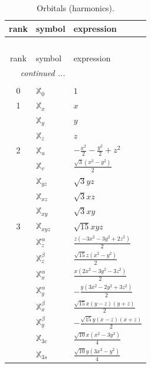 \documentclass[fleqn,9pt,landscape]{jsarticle}
\begin{document}
\begin{longtable}{cll}
\caption{Orbitals (harmonics).}
 \\
 \hline \hline
rank & symbol & expression \\ \hline \endfirsthead

\multicolumn{2}{l}{\tablename\ \thetable{}} \\
 \hline \hline
rank & symbol & expression \\ \hline \endhead

 \hline \hline
\multicolumn{2}{r}{\footnotesize\it continued ...} \\ \endfoot

 \hline \hline
\multicolumn{2}{r}{} \\ \endlastfoot

0 & $\mathbb{X}_{0}$ & $1$ \\ \hline
1 & $\mathbb{X}_{x}$ & $x$ \\
 & $\mathbb{X}_{y}$ & $y$ \\
 & $\mathbb{X}_{z}$ & $z$ \\ \hline
2 & $\mathbb{X}_{u}$ & $- \frac{x^{2}}{2} - \frac{y^{2}}{2} + z^{2}$ \\
 & $\mathbb{X}_{v}$ & $\frac{\sqrt{3} \left(x^{2} - y^{2}\right)}{2}$ \\
 & $\mathbb{X}_{yz}$ & $\sqrt{3} y z$ \\
 & $\mathbb{X}_{xz}$ & $\sqrt{3} x z$ \\
 & $\mathbb{X}_{xy}$ & $\sqrt{3} x y$ \\ \hline
3 & $\mathbb{X}_{xyz}$ & $\sqrt{15} x y z$ \\
 & $\mathbb{X}_{z}^{\alpha}$ & $\frac{z \left(- 3 x^{2} - 3 y^{2} + 2 z^{2}\right)}{2}$ \\
 & $\mathbb{X}_{z}^{\beta}$ & $\frac{\sqrt{15} z \left(x^{2} - y^{2}\right)}{2}$ \\
 & $\mathbb{X}_{x}^{\alpha}$ & $\frac{x \left(2 x^{2} - 3 y^{2} - 3 z^{2}\right)}{2}$ \\
 & $\mathbb{X}_{y}^{\alpha}$ & $- \frac{y \left(3 x^{2} - 2 y^{2} + 3 z^{2}\right)}{2}$ \\
 & $\mathbb{X}_{x}^{\beta}$ & $\frac{\sqrt{15} x \left(y - z\right) \left(y + z\right)}{2}$ \\
 & $\mathbb{X}_{y}^{\beta}$ & $- \frac{\sqrt{15} y \left(x - z\right) \left(x + z\right)}{2}$ \\
 & $\mathbb{X}_{3c}$ & $\frac{\sqrt{10} x \left(x^{2} - 3 y^{2}\right)}{4}$ \\
 & $\mathbb{X}_{3s}$ & $\frac{\sqrt{10} y \left(3 x^{2} - y^{2}\right)}{4}$ \\

\end{longtable}
\end{document}
